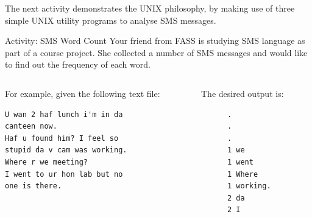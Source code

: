 The next activity demonstrates the UNIX philosophy, by making use
of three simple UNIX utility programs to analyse SMS messages.  

\begin{frame}{Activity: SMS Word Count}
Your friend from FASS is studying SMS language as part of a course project. She
collected a number of SMS messages and would like to find out the frequency of
each word. 
\end{frame}

\begin{frame}[fragile]
\begin{columns}
\begin{column}{0.5\textwidth}
For example, given the following text file:
\begin{verbatim}
U wan 2 haf lunch i'm in da 
canteen now.
Haf u found him? I feel so 
stupid da v cam was working.
Where r we meeting?
I went to ur hon lab but no 
one is there.
\end{verbatim}
\end{column}
\begin{column}{0.5\textwidth}
The desired output is:
\begin{verbatim}
      .
      .
      .
      1 we
      1 went
      1 Where
      1 working.
      2 da
      2 I
\end{verbatim}
\end{column}
\end{columns}
\end{frame}

